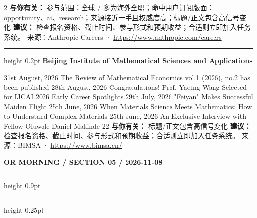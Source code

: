 \documentclass[10.5pt]{ctexart}
\begin{document}
\begin{multicols}{2}
\textbf{与你有关：} 参与范围：全球 / 多为海外全职；命中用户订阅版面：opportunity、ai、research；来源接近一手且权威度高；标题/正文包含高信号变化
\textbf{建议：} 检查报名资格、截止时间、参与形式和预期收益；合适则立即加入任务系统。
{\footnotesize\color{ormuted} 来源：Anthropic Careers · \url{https://www.anthropic.com/careers}}
\vspace{2mm}
\hrule height 0.2pt
\vspace{2mm}
{\large\bfseries Beijing Institute of Mathematical Sciences and Applications}\par
31st August, 2026 The Review of Mathematical Economics vol.1 (2026), no.2 has been published 28th August, 2026 Congratulations! Prof. Yaqing Wang Selected for IJCAI 2026 Early Career Spotlights 29th July, 2026 "Feiyan" Makes Successful Maiden Flight 25th June, 2026 When Materials Science Meets Mathematics: How to Understand Complex Materials 25th June, 2026 An Exclusive Interview with Fellow Oluwole Daniel Makinde 22
\textbf{与你有关：} 标题/正文包含高信号变化
\textbf{建议：} 检查报名资格、截止时间、参与形式和预期收益；合适则立即加入任务系统。
{\footnotesize\color{ormuted} 来源：BIMSA · \url{https://www.bimsa.cn/}}
\end{multicols}
\newpage
{\small\bfseries OR MORNING / SECTION 05 / 2026-11-08}
\vspace{2mm}
\hrule height 0.9pt
\vspace{1.5mm}
\hrule height 0.25pt
\vspace{4mm}
\end{document}
